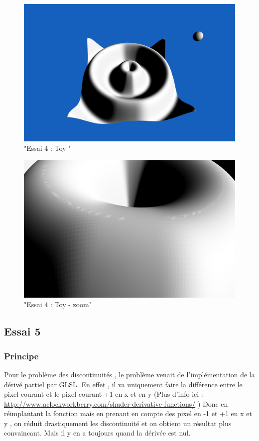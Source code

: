 \documentclass[a4paper]{article}
\begin{document}
\begin{figure}[thb]
	\centering
    \includegraphics[scale=0.3]{Images/Essais/Essai_4_toy.png}
    \caption{"Essai 4 : Toy "}
 \end{figure}

\begin{figure}[thb]
	\centering
    \includegraphics[scale=0.3]{Images/Essais/Essai_4_toy_zoom.png}
    \caption{"Essai 4 : Toy  - zoom"}
 \end{figure}
 
\subsection{Essai 5}
\subsubsection{Principe}
Pour le problème des discontinuités , le problème venait de l'implémentation de la dérivé partiel par GLSL. En effet , il va uniquement faire la différence entre le pixel courant et le pixel courant +1 en x et en y (Plus d'info ici : \url{http://www.aclockworkberry.com/shader-derivative-functions/} ) Donc en réimplantant la fonction mais en prenant en compte des pixel en -1 et +1 en x et y , on réduit drastiquement les discontinuité et on obtient un résultat plus convaincant. Mais il y en a toujours quand la dérivée est nul. 
\end{document}
